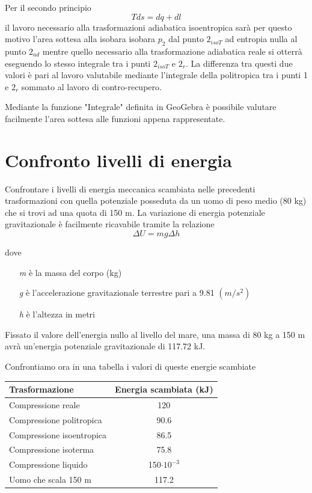 \documentclass[a4paper,12pt]{article}
\begin{document}
Per il secondo principio
\begin{equation}
    \label{eq:seconmdo_principio}
    Tds = dq + dl
\end{equation}
il lavoro necessario alla trasformazioni adiabatica isoentropica sarà per questo motivo l'area sottesa
alla isobara isobara $p_2$ dal punto $2_{isoT}$ ad entropia nulla al punto $2_{ad}$
mentre quello necessario alla trasformazione adiabatica reale si otterrà eseguendo lo stesso integrale tra i punti
$2_{isoT}$ e $2_r$.
La differenza tra questi due valori è pari al lavoro valutabile mediante l'integrale della politropica tra i punti
1 e $2_r$ sommato al lavoro di contro-recupero.

Mediante la funzione "Integrale" definita in GeoGebra è possibile valutare facilmente
l'area sottesa alle funzioni appena rappresentate.

\section{Confronto livelli di energia}
Confrontare i livelli di energia meccanica scambiata nelle precedenti trasformazioni con 
quella potenziale posseduta da un uomo di peso medio (80 kg) che si trovi ad una quota di 150 m.
La variazione di energia potenziale gravitazionale è facilmente ricavabile tramite la relazione
\begin{equation}
    \Delta U = mg\Delta h
\end{equation}

dove
\begin{itemize}
    \item[\textit{m}] è la massa del corpo (kg)
    \item[\textit{g}] è l'accelerazione gravitazionale terrestre pari a 9.81 $(m/s^2)$ 
    \item[\textit{h}] è l'altezza in metri
\end{itemize}  
Fissato il valore dell'energia nullo al livello del mare, una massa di 80 kg a 150 m avrà
un'energia potenziale gravitazionale di 117.72 kJ.

Confrontiamo ora in una tabella i valori di queste energie scambiate
\begin{center}
    \begin{tabular}{l|c}
        Trasformazione & Energia scambiata (kJ)\\ \hline
        Compressione reale        & 120  \\
        Compressione politropica  & 90.6 \\
        Compressione isoentropica & 86.5 \\
        Compressione isoterma     & 75.8 \\
        Compressione liquido      & 150$\cdot 10^{-3}$  \\
        Uomo che scala 150 m      & 117.2
    \end{tabular}
\end{center}
\end{document}

